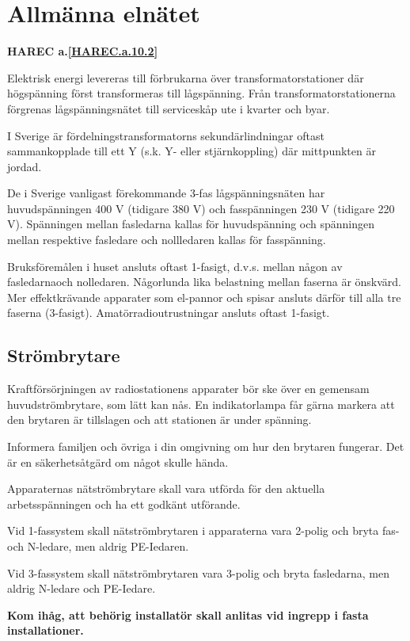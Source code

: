\section{Allmänna elnätet}
\textbf{
HAREC a.\ref{HAREC.a.10.2}\label{myHAREC.a.10.2}
}

Elektrisk energi levereras till förbrukarna över
transformatorstationer där högspänning först transformeras till
lågspänning. Från transformatorstationerna förgrenas lågspänningsnätet
till serviceskåp ute i kvarter och byar.

I Sverige är fördelningstransformatorns sekundärlindningar oftast
sammankopplade till ett Y (s.k. Y- eller stjärnkoppling) där
mittpunkten är jordad.

De i Sverige vanligast förekommande 3-fas lågspänningsnäten har
huvudspänningen 400 V (tidigare 380 V) och fasspänningen 230 V
(tidigare 220 V). Spänningen mellan fasledarna kallas för
huvudspänning och spänningen mellan respektive fasledare och
nollledaren kallas för fasspänning.

Bruksföremålen i huset ansluts oftast 1-fasigt, d.v.s. mellan någon av
fasledarnaoch nolledaren. Någorlunda lika belastning mellan faserna är
önskvärd.  Mer effektkrävande apparater som el-pannor och spisar
ansluts därför till alla tre faserna (3-fasigt).
Amatörradioutrustningar ansluts oftast 1-fasigt.

\subsection{Strömbrytare}

Kraftförsörjningen av radiostationens apparater bör ske över en
gemensam huvudströmbrytare, som lätt kan nås. En indikatorlampa får
gärna markera att den brytaren är tillslagen och att stationen är
under spänning.

Informera familjen och övriga i din omgivning om hur den brytaren
fungerar. Det är en säkerhetsåtgärd om något skulle hända.

Apparaternas nätströmbrytare skall vara utförda för den aktuella
arbetsspänningen och ha ett godkänt utförande.

Vid 1-fassystem skall nätströmbrytaren i apparaterna vara 2-polig och
bryta fas- och N-ledare, men aldrig PE-Iedaren.

Vid 3-fassystem skall nätströmbrytaren
vara 3-polig och bryta fasledarna, men aldrig
N-ledare och PE-Iedare.

\textbf{Kom ihåg, att behörig installatör skall
  anlitas vid ingrepp i fasta installationer.}

